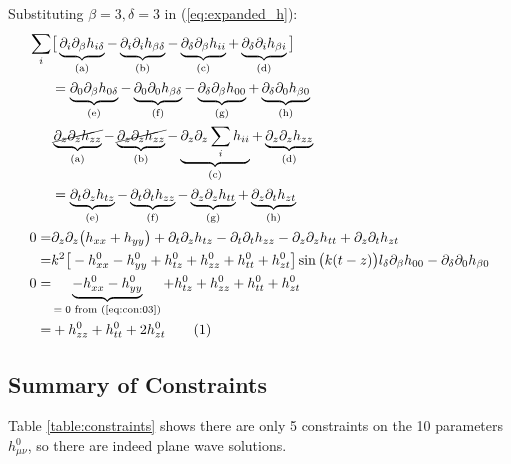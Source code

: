 \documentclass[]{article}
\newcommand\numberthis{\addtocounter{equation}{1}\tag{\theequation}}
\begin{document}
Substituting $\beta=3,\delta=3$ in (\ref{eq:expanded_h}):
\begin{align*}
	\sum_i&\big[\underbrace{\partial_i\partial_\beta h_{i\delta}}_\text{(a)} - \underbrace{\partial_i\partial_i h_{\beta\delta}}_\text{(b)} -  \underbrace{\partial_\delta\partial_\beta h_{ii}}_\text{(c)} + \underbrace{\partial_\delta\partial_i h_{\beta i}}_\text{(d)}\big]\\
	&=\underbrace{\partial_0\partial_\beta h_{0\delta}}_\text{(e)} - \underbrace{\partial_0\partial_0 h_{\beta\delta}}_\text{(f)} -  \underbrace{\partial_\delta\partial_\beta h_{00}}_\text{(g)} + \underbrace{\partial_\delta\partial_0 h_{\beta 0}}_\text{(h)}\\
	&\underbrace{\cancel{\partial_z\partial_z h_{zz}}}_\text{(a)} - \underbrace{\cancel{\partial_z\partial_z h_{zz}}}_\text{(b)} -  \underbrace{\partial_z\partial_z \sum_i h_{ii}}_\text{(c)} + \underbrace{\partial_z\partial_z h_{zz}}_\text{(d)}\\
	&=\underbrace{\partial_t\partial_z h_{tz}}_\text{(e)} - \underbrace{\partial_t\partial_t h_{zz}}_\text{(f)} -  \underbrace{\partial_z\partial_z h_{tt}}_\text{(g)} + \underbrace{\partial_z\partial_t h_{zt}}_\text{(h)}\\
	0=& \partial_z\partial_z\big(h_{xx}+h_{yy}\big) + \partial_t\partial_z h_{tz} - \partial_t\partial_t h_{zz} - \partial_z\partial_z h_{tt} +\partial_z\partial_t h_{zt}\\
	=&k^2 \big[-h^0_{xx} - h^0_{yy} + h^0_{tz} +  h^0_{zz} + h^0_{tt} + h^0_{zt}\big] \sin\big(k(t-z)\big)l_\delta\partial_\beta h_{00} - \partial_\delta\partial_0 h_{\beta 0} \\
	0=&\underbrace{-h^0_{xx} - h^0_{yy}}_\text{$=0$ from (\ref{eq:con:03})} + h^0_{tz} +  h^0_{zz} + h^0_{tt} + h^0_{zt}\\
	=&  +  h^0_{zz} + h^0_{tt} + 2h^0_{zt} \numberthis \label{eq:con:33}
\end{align*}	

\subsection{Summary of Constraints}

Table \ref{table:constraints} shows there are only 5 constraints on the 10 parameters $h^0_{\mu\nu}$, so there are indeed plane wave solutions.
\end{document}
